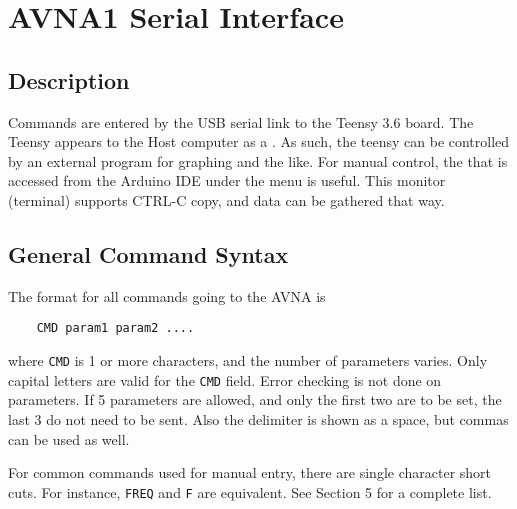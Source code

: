 \section{AVNA1 Serial Interface}
\label{sect:Ser}   %

\subsection{Description}
\label{subsect:SerDes}
Commands are entered by the USB serial link to the Teensy 3.6 board. The Teensy appears to the Host computer as a . As such, the teensy can be controlled by an external program for graphing and the like.  For manual control, the  that is accessed from the Arduino IDE under the menu  is useful.  This monitor (terminal) supports CTRL-C copy, and data can be gathered that way.

\subsection{General Command Syntax}
\label{subsect:SerSyn}
The format for all commands going to the AVNA is
\begin{verbatim}
    CMD param1 param2 ....
\end{verbatim}
where \texttt{CMD} is 1 or more characters, and the number of parameters varies.  Only capital letters are valid for the \texttt{CMD} field. Error checking is not done on parameters.  If 5 parameters are allowed, and only the first two are to be set, the last 3 do not need to be sent.  Also the delimiter is shown as a space, but commas can be used as well.

For common commands used for manual entry, there are single character short cuts.  For instance, \texttt{FREQ} and \texttt{F} are equivalent. See Section 5 for a complete list.


